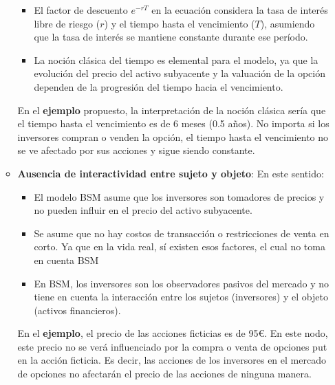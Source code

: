 \begin{problema}[Problema D]
\begin{itemize}
\begin{sol}
\begin{itemize}
\begin{itemize}
       \item El factor de descuento $e^{-rT}$ en la ecuación considera la tasa de interés libre de riesgo ($r$) y el tiempo hasta el vencimiento ($T$), asumiendo que la tasa de interés se mantiene constante durante ese período.
        
        \item La noción clásica del tiempo es elemental para el modelo, ya que la evolución del precio del activo subyacente y la valuación de la opción dependen de la progresión del tiempo hacia el vencimiento.
    
    \end{itemize}
    \begin{cajita}
        En el \textbf{ejemplo} propuesto, la interpretación de la noción clásica sería que el tiempo hasta el vencimiento es de 6 meses (0.5 años). No importa si los inversores compran o venden la opción, el tiempo hasta el vencimiento no se ve afectado por sus acciones y sigue siendo constante. 
    \end{cajita}

    \item \textbf{Ausencia de interactividad entre sujeto y objeto}: En este sentido: 
    \begin{itemize}
        \item El modelo BSM asume que los inversores son tomadores de precios y no pueden influir en el precio del activo subyacente.
        \item Se asume que no hay costos de transacción o restricciones de venta en corto. Ya que en la vida real, sí existen esos factores, el cual no toma en cuenta BSM 
        \item En BSM, los inversores son los observadores pasivos del mercado y no tiene en cuenta la interacción entre los sujetos (inversores) y el objeto (activos financieros).
    \end{itemize}
    \begin{cajita}
        En el \textbf{ejemplo}, el precio de las acciones ficticias es de 95€. En este nodo, este precio no se verá influenciado por la compra o venta de opciones put en la acción ficticia.  Es decir, las acciones de los inversores en el mercado de opciones no afectarán el precio de las acciones de ninguna manera. 
    \end{cajita}
    

\end{itemize}
\end{sol}
\end{itemize}
\end{problema}
